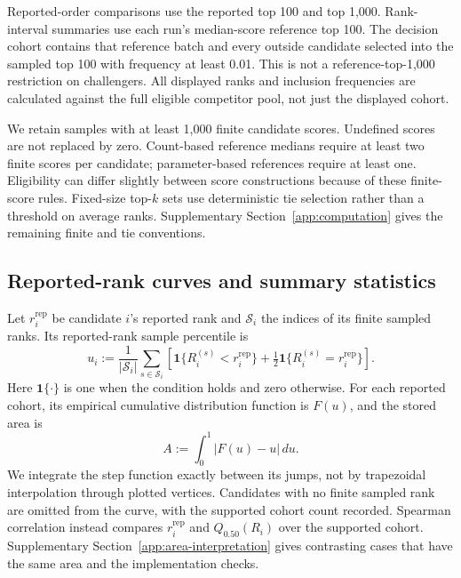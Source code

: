 Reported-order comparisons use the reported top 100 and top 1,000.
Rank-interval summaries use each run's median-score reference top
100. The decision cohort contains that reference batch and every
outside candidate selected into the sampled top 100 with frequency
at least 0.01. This is not a reference-top-1,000 restriction on
challengers. All displayed ranks and inclusion frequencies are
calculated against the full eligible competitor pool, not just
the displayed cohort.

We retain samples with at least 1,000 finite candidate scores.
Undefined scores are not replaced by zero. Count-based reference
medians require at least two finite scores per candidate;
parameter-based references require at least one. Eligibility can differ
slightly between score constructions because of these finite-score rules. Fixed-size
top-$k$ sets use deterministic tie selection rather than a
threshold on average ranks. Supplementary
Section~\ref{app:computation} gives the remaining finite and
tie conventions.

\subsection{Reported-rank curves and summary statistics}

Let $r_i^{\mathrm{rep}}$ be candidate $i$'s reported rank and
$\mathcal S_i$ the indices of its finite sampled ranks. Its
reported-rank sample percentile is
\[
u_i:=\frac{1}{|\mathcal S_i|}\sum_{s\in\mathcal S_i}
\left[\mathbf1\{R_i^{(s)}<r_i^{\mathrm{rep}}\}
+\tfrac12\mathbf1\{R_i^{(s)}=r_i^{\mathrm{rep}}\}\right].
\]
Here $\mathbf1\{\cdot\}$ is one when the condition holds and zero
otherwise. For each reported cohort, its empirical cumulative
distribution function is $F(u)$, and the stored area is
\[
A:=\int_0^1|F(u)-u|\,du.
\]
We integrate the step function exactly between its jumps, not
by trapezoidal interpolation through plotted vertices. Candidates
with no finite sampled rank are omitted from the curve, with
the supported cohort count recorded. Spearman correlation instead
compares $r_i^{\mathrm{rep}}$ and $Q_{0.50}(R_i)$ over the supported
cohort. Supplementary
Section~\ref{app:area-interpretation} gives contrasting cases that
have the same area and the implementation checks.

